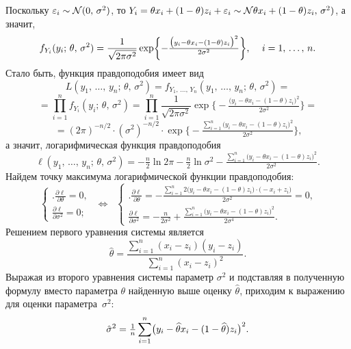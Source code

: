 \begin{problem}
\begin{sol}
Поскольку $\varepsilon_i \sim \mathcal{N}(0, \, \sigma^2)$, то $Y_i = \theta x_i + (1 - \theta) z_i + \varepsilon_i \sim \mathcal{N}\theta x_i + (1 - \theta) z_i, \, \sigma^2)$, а значит,
\[
    f_{Y_i}(y_i; \, \theta, \, \sigma^2) = \frac{1}{\sqrt{2\pi\sigma^2}} \exp\biggl\{-\tfrac{\bigl(y_i - \theta x_i - (1 - \theta) z_i\bigr)^2}{2\sigma^2}\biggr\} \text{, \quad} i = 1, \, \ldots, \, n \text{.}
\]
Стало быть, функция правдоподобия имеет вид
\[
    L(y_1, \, \ldots, \, y_n; \, \theta, \, \sigma^2) = f_{Y_1, \, \ldots, \, Y_n}(y_1, \, \ldots, \, y_n; \, \theta, \, \sigma^2) =
\]
\[
    = \prod_{i=1}^{n}f_{Y_i}(y_i; \, \theta, \, \sigma^2) = \prod_{i=1}^{n}\frac{1}{\sqrt{2\pi\sigma^2}} \exp\biggl\{-\tfrac{\bigl(y_i - \theta x_i - (1 - \theta) z_i\bigr)^2}{2\sigma^2}\biggr\} =
\]
\[
    = (2\pi)^{-n/2} \cdot (\sigma^2)^{-n/2} \cdot \exp\biggl\{-\tfrac{\sum_{i=1}^{n}\bigl(y_i - \theta x_i - (1 - \theta) z_i\bigr)^2}{2\sigma^2}\biggr\} \text{,}
\]
а значит, логарифмическая функция правдоподобия
\[
    \ell(y_1, \, \ldots, \, y_n; \, \theta, \, \sigma^2) = -\tfrac{n}{2}\ln{2\pi} -\tfrac{n}{2}\ln{\sigma^2} -\tfrac{\sum_{i=1}^{n}\bigl(y_i - \theta x_i - (1 - \theta) z_i\bigr)^2}{2\sigma^2} \text{.}
\]
Найдем точку максимума логарифмической функции правдоподобия:
\[
    \left\{
      \begin{array}{ll}
        \biggl. \frac{\partial \ell}{\partial \theta} = 0 \text{,} \\
                \frac{\partial \ell}{\partial \sigma^2} = 0 \text{;}
      \end{array}
    \right. \;\; \Leftrightarrow \;\;
    \left\{
      \begin{array}{ll}
        \biggl. \frac{\partial \ell}{\partial \theta} = -\tfrac{\sum_{i=1}^{n}2\bigl(y_i - \theta x_i - (1 - \theta) z_i\bigr)\cdot \bigl(- x_i + z_i\bigr)}{2\sigma^2} = 0 \text{,} \\
                \frac{\partial \ell}{\partial \sigma^2} = -\tfrac{n}{2\sigma^2} +\tfrac{\sum_{i=1}^{n}\bigl(y_i - \theta x_i - (1 - \theta) z_i\bigr)^2}{2\sigma^4} \text{.}
      \end{array}
    \right.
\]
Решением первого уравнения системы является
\[
    \hat{\theta} = \frac{\sum_{i=1}^{n}(x_i - z_i)(y_i - z_i)}{\sum_{i=1}^{n}(x_i - z_i)^2} \text{.}
\]
Выражая из второго уравнения системы параметр $\sigma^2$ и подставляя в полученную формулу вместо параметра $\theta$ найденную выше оценку $\widehat{\theta}$, приходим к выражению для оценки параметра~$\sigma^2$:
\[
    \hat{\sigma}^2 = \tfrac{1}{n}\sum_{i=1}^{n}\bigl(y_i - \widehat{\theta} x_i - (1 - \widehat{\theta}) z_i\bigr)^2 \text{.}
\]
\end{sol}
\end{problem}






